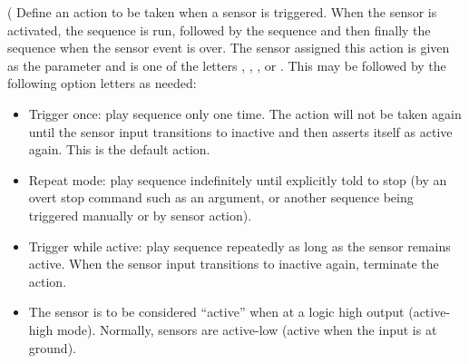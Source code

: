 \begin{list}{}{}
(
\codetype{:}\codetype{:}\codetype{\textnormal{)}}
Define an action to be taken when a sensor is triggered.  When the sensor
is activated, the sequence
is run, followed by the sequence
and then finally the sequence
when the sensor event is over.  The sensor assigned this action is given
as the parameter
and is one of the letters 
,
,
,
or
.
This may be followed by the following option letters as needed:
\begin{itemize}
\item[{\codetype{o}}]
Trigger once: play sequence
only one time.  The action will not be taken again until the sensor
input transitions to inactive and then asserts itself as active again.
This is the default action.
\item[{\codetype{r}}]
Repeat mode: play sequence
indefinitely until explicitly told to stop (by an overt stop command
such as an
argument, or another sequence being triggered manually or by sensor
action).
\item[{\codetype{w}}]
Trigger while active: play sequence
repeatedly as long as the sensor remains active.  When the sensor input
transitions to inactive again, terminate the action.
\item[{\codetype{+}}]
The sensor is to be considered ``active'' when at a logic
high output (active-high mode).  Normally, sensors are active-low
(active when the input is at ground).
\end{itemize}



\end{list}
